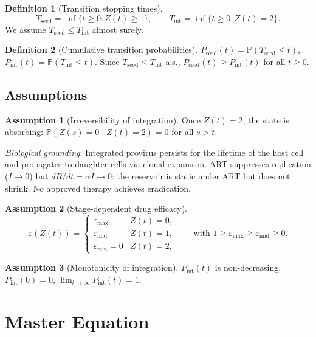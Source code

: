 \documentclass[11pt]{article}
\theoremstyle{definition}
\newtheorem{definition}{Definition}[section]
\newtheorem{assumption}{Assumption}[section]
\theoremstyle{remark}
\newcommand{\Tseed}{T_{\text{seed}}}
\newcommand{\Tint}{T_{\text{int}}}
\newcommand{\Pseed}{P_{\text{seed}}}
\newcommand{\Pint}{P_{\text{int}}}
\newcommand{\emax}{\varepsilon_{\max}}
\newcommand{\emid}{\varepsilon_{\text{mid}}}
\newcommand{\emin}{\varepsilon_{\min}}
\begin{document}
\begin{definition}[Transition stopping times]
\[
\Tseed = \inf\{t \geq 0 : Z(t) \geq 1\}, \qquad
\Tint  = \inf\{t \geq 0 : Z(t) = 2\}.
\]
We assume $\Tseed \leq \Tint$ almost surely.
\end{definition}

\begin{definition}[Cumulative transition probabilities]
$\Pseed(t) = \mathbb{P}(\Tseed \leq t)$, $\Pint(t) = \mathbb{P}(\Tint \leq t)$. Since $\Tseed \leq \Tint$ a.s., $\Pseed(t) \geq \Pint(t)$ for all $t \geq 0$.
\end{definition}

\subsection{Assumptions}

\begin{assumption}[Irreversibility of integration]
Once $Z(t) = 2$, the state is absorbing: $\mathbb{P}(Z(s) = 0 \mid Z(t) = 2) = 0$ for all $s > t$.

\textit{Biological grounding}: Integrated provirus persists for the lifetime of the host cell and propagates to daughter cells via clonal expansion. ART suppresses replication ($I \to 0$) but $dR/dt = \alpha I \to 0$: the reservoir is static under ART but does not shrink. No approved therapy achieves eradication.
\end{assumption}

\begin{assumption}[Stage-dependent drug efficacy]
\[
\varepsilon(Z(t)) =
\begin{cases}
\emax & Z(t) = 0,\\
\emid & Z(t) = 1,\\
\emin = 0 & Z(t) = 2,
\end{cases}
\qquad
\text{with } 1 \geq \emax \geq \emid \geq 0.
\]
\end{assumption}

\begin{assumption}[Monotonicity of integration]
$\Pint(t)$ is non-decreasing, $\Pint(0) = 0$, $\lim_{t\to\infty} \Pint(t) = 1$.
\end{assumption}

\section{Master Equation}
\end{document}
